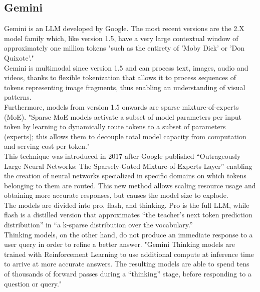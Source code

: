 \documentclass[12pt]{article}
\begin{document}
    \subsection{Gemini}
Gemini is an LLM developed by Google. The most recent versions are the 2.X model family which, like version 1.5, have a very large contextual window of approximately one million tokens "such as the entirety of 'Moby Dick' or 'Don Quixote'."\cite{comanici2025gemini25pushingfrontier}\\
Gemini is multimodal since version 1.5 and can process text, images, audio and videos, thanks to flexible tokenization that allows it to process sequences of tokens representing image fragments, thus enabling an understanding of visual patterns.\\
Furthermore, models from version 1.5 onwards are sparse mixture-of-experts (MoE). "Sparse MoE models activate a subset of model parameters per input token by learning to dynamically route tokens to a subset of parameters (experts); this allows them to decouple total model capacity from computation and serving cost per token."\cite{comanici2025gemini25pushingfrontier}\\
This technique was introduced in 2017 after Google published “Outrageously Large Neural Networks: The Sparsely-Gated Mixture-of-Experts Layer”\cite{shazeer2017outrageouslylargeneuralnetworks} enabling the creation of neural networks specialized in specific domains on which tokens belonging to them are routed. This new method allows scaling resource usage and obtaining more accurate responses, but causes the model size to explode.\\
The models are divided into pro, flash, and thinking.
Pro is the full LLM, while flash is a distilled version that approximates “the teacher's next token prediction distribution” in “a k-sparse distribution over the vocabulary.”\\
Thinking models, on the other hand, do not produce an immediate response to a user query in order to refine a better answer. "Gemini Thinking models are trained with Reinforcement Learning to use additional compute at inference time to arrive at more accurate answers. The resulting models are able to spend tens of thousands of forward passes during a “thinking” stage, before responding to a question or query."\cite{comanici2025gemini25pushingfrontier}\\
\end{document}
